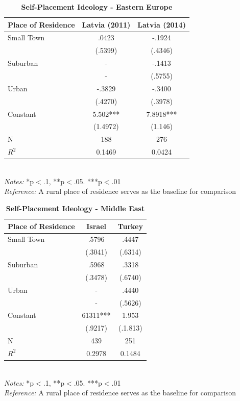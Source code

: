 \documentclass[12pt, titlepage]{article}
\newcommand\e{\emph}
\newcommand\tb{\textbf}
\begin{document}
\begin{singlespace}
	\begin{table}[H]
		\centering
		\caption{\tb{Self-Placement Ideology - Eastern Europe}}
		\begin{tabulary}{\linewidth}{l c c}
			\\
			\hline
			\tb{Place of Residence} & \tb{Latvia (2011)} &\tb{Latvia (2014)} \\
			\hline
			Small Town &.0423 &-.1924 \\
			&(.5399) & (.4346) \\
			Suburban&- & -.1413 \\
			& - & (.5755) \\
			Urban&-.3829&-.3400 \\
			& (.4270) & (.3978) \\
			Constant & 5.502*** &7.8918*** \\
			& (1.4972) & (1.146) \\
			N&188 & 276\\
			$R^2$& 0.1469 &0.0424 \\
			\hline
		\end{tabulary}
		\\
		\e{Notes:} *p$<$.1, **p$<$.05. ***p$<$.01 \\
		\e{Reference:} A rural place of residence serves as the baseline for comparison
		\label{table9}
	\end{table}
\end{singlespace}

\begin{singlespace}
	\begin{table}[H]
		\centering
		\caption{\tb{Self-Placement Ideology - Middle East}}
		\begin{tabulary}{\linewidth}{l c c}
			\\
			\hline
			\tb{Place of Residence}&\tb{Israel} & \tb{Turkey} \\
			\hline
			Small Town&.5796 & .4447 \\
			&(.3041)  & (.6314)\\
			Suburban&.5968 &.3318 \\
			& (.3478)  & (.6740)\\
			Urban &- & .4440\\
			&- & (.5626)\\
			Constant& 61311*** &1.953 \\
			& (.9217)  & (.1.813)\\
			N&439 & 251\\
			$R^2$&0.2978 & 0.1484 \\
			\hline 
		\end{tabulary}
		\\
		\e{Notes:} *p$<$.1, **p$<$.05. ***p$<$.01 \\
		\e{Reference:} A rural place of residence serves as the baseline for comparison
		\label{table10}
	\end{table}
\end{singlespace}
\end{document}

